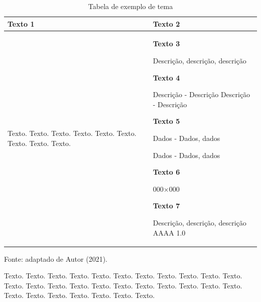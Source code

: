 \begin{onehalfspacing}
    \renewcommand\tabularxcolumn[1]{>{\Centering}m{#1}} 
        \begin{table}[ht]
        \caption{Tabela de exemplo de tema}
            \begin{center}\large
                \begin{tabularx}{\textwidth}{|X|X|}
                    \hline
                    \textbf{Texto 1} \cellcolor{black!20} & \textbf{Texto 2} \cellcolor{black!20}  \\
                    \hline
                    Texto. Texto. Texto. Texto. Texto. Texto. Texto. Texto. Texto. \cellcolor{black!5} & \textbf{Texto 3}
                        
                    Descrição, descrição, descrição
                    
                    \textbf{Texto 4}
                        
                    Descrição - Descrição
                    Descrição - Descrição

                    \textbf{Texto 5}
                        
                    Dados - Dados, dados
                        
                    Dados - Dados, dados

                    \textbf{Texto 6}
                        
                    000×000

                    \textbf{Texto 7}
                        
                    Descrição, descrição, descrição AAAA 1.0 \cellcolor{black!5} \\
                \hline
            \end{tabularx}
        \end{center}
        \begin{small}
            Fonte: adaptado de Autor (2021).\\
        \end{small}
    \end{table}
\end{onehalfspacing}

\begin{onehalfspacing}
    \begin{justify}
        \begin{large}
            Texto. Texto. Texto. Texto. Texto. Texto. Texto. Texto. Texto. Texto. Texto. Texto. Texto. Texto. Texto. Texto. Texto. Texto. Texto. Texto. Texto. Texto. Texto. Texto. Texto. Texto. Texto. Texto. Texto.
        \end{large}
    \end{justify}
\end{onehalfspacing}\pagebreak





